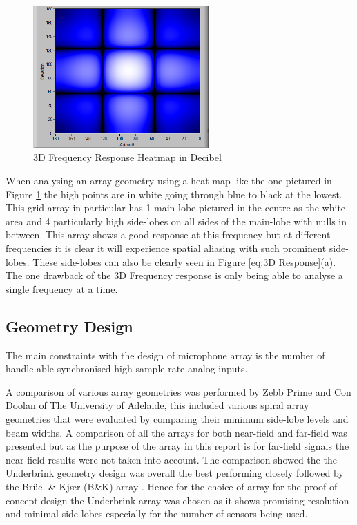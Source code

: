 \documentclass{UoNMCHA}
\numberwithin{equation}{section}
\begin{document}
    \begin{figure}[H]
        \centering
        \includegraphics[keepaspectratio, width = 0.6\textwidth]{Figures/3DHeatFigure.png}
        \caption{3D Frequency Response Heatmap in Decibel}
        \label{fig:3D Heatmap}
    \end{figure}
    
    When analysing an array geometry using a heat-map like the one pictured in Figure \ref{fig:3D Heatmap} the high points are in white going through blue to black at the lowest. This grid array in particular has 1 main-lobe pictured in the centre as the white area and 4 particularly high side-lobes on all sides of the main-lobe with nulls in between. This array shows a good response at this frequency but at different frequencies it is clear it will experience spatial aliasing with such prominent side-lobes. These side-lobes can also be clearly seen in Figure \ref{eq:3D Response}(a). The one drawback of the 3D Frequency response is only being able to analyse a single frequency at a time.

\subsection{Geometry Design} \label{sec:Array Geometry}

    The main constraints with the design of microphone array is the number of handle-able synchronised high sample-rate analog inputs.
    
    A comparison of various array geometries was performed by Zebb Prime and Con Doolan of The University of Adelaide, this included various spiral array geometries that were evaluated by comparing their minimum side-lobe levels and beam widths. A comparison of all the arrays for both near-field and far-field was presented but as the purpose of the array in this report is for far-field signals the near field results were not taken into account. The comparison showed the the Underbrink geometry design was overall the best performing closely followed by the Brüel \& Kjær (B\&K) array \citep{Pri13}. Hence for the choice of array for the proof of concept design the Underbrink array was chosen as it shows promising resolution and minimal side-lobes especially for the number of sensors being used.
    
\end{document}
